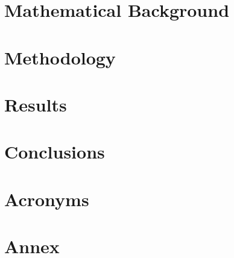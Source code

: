 \documentclass[mscthesis]{usiinfthesis}
\begin{document}
\chapter{Mathematical Background}\label{chap:mathematical-background}








\chapter{Methodology} \label{chap:methodology}







\chapter{Results} \label{chap:results}








\chapter{Conclusions} \label{chap:conclusions}



\appendix %

\backmatter

\chapter{Acronyms} \label{chap:acronyms} %


\chapter{Annex} \label{chap:annex}


%
%



\end{document}
